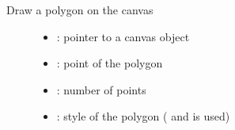 \documentclass[letterpaper,10pt,english]{sphinxmanual}
\begin{document}
\begin{fulllineitems}
\label{\detokenize{object-types/canvas:_CPPv422lv_canvas_draw_polygonP8lv_obj_tPK10lv_point_t8uint32_tPK10lv_style_t}}%
\pysigstartmultiline
{}\label{\detokenize{object-types/canvas:lv__canvas_8h_1a003d4b28d49437635958af6a7084c5e8}}%
\pysigstopmultiline
Draw a polygon on the canvas \begin{description}
\item[{}] \leavevmode\begin{itemize}
\item {} 
: pointer to a canvas object 

\item {} 
: point of the polygon 

\item {} 
: number of points 

\item {} 
: style of the polygon ( and  is used) 

\end{itemize}

\end{description}


\end{fulllineitems}

\end{document}
